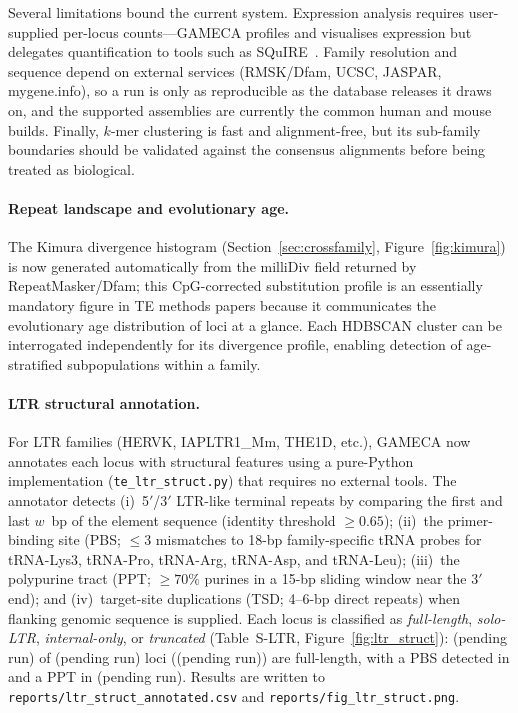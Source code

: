 \documentclass[11pt]{article}
\providecommand{\ltrNloci}{(pending run)}\providecommand{\ltrNfull}{(pending run)}
\providecommand{\ltrNppt}{(pending run)}\providecommand{\ltrPctFull}{(pending run)}
\begin{document}
Several limitations bound the current system. Expression analysis requires user-supplied
per-locus counts---GAMECA profiles and visualises expression but delegates quantification to
tools such as SQuIRE~\citep{yang2019squire}. Family resolution and sequence depend on
external services (RMSK/Dfam, UCSC, JASPAR, mygene.info), so a run is only as reproducible as
the database releases it draws on, and the supported assemblies are currently the common
human and mouse builds. Finally, $k$-mer clustering is fast and alignment-free, but its
sub-family boundaries should be validated against the consensus alignments before being
treated as biological.

\paragraph{Repeat landscape and evolutionary age.}
The Kimura divergence histogram (Section~\ref{sec:crossfamily}, Figure~\ref{fig:kimura})
is now generated automatically from the milliDiv field returned by RepeatMasker/Dfam; this
CpG-corrected substitution profile is an essentially mandatory figure in TE methods papers
because it communicates the evolutionary age distribution of loci at a glance.  Each
HDBSCAN cluster can be interrogated independently for its divergence profile, enabling
detection of age-stratified subpopulations within a family.

\paragraph{LTR structural annotation.}
For LTR families (HERVK, IAPLTR1\_Mm, THE1D, etc.), GAMECA now annotates each locus
with structural features using a pure-Python implementation (\texttt{te\_ltr\_struct.py})
that requires no external tools.  The annotator detects (i)~5$'$/3$'$ LTR-like terminal
repeats by comparing the first and last $w$~bp of the element sequence (identity
threshold $\geq 0.65$); (ii)~the primer-binding site (PBS; $\leq 3$ mismatches to
18-bp family-specific tRNA probes for tRNA-Lys3, tRNA-Pro, tRNA-Arg, tRNA-Asp, and
tRNA-Leu); (iii)~the polypurine tract (PPT; $\geq 70\%$ purines in a 15-bp sliding
window near the 3$'$ end); and (iv)~target-site duplications (TSD; 4--6-bp direct
repeats) when flanking genomic sequence is supplied.  Each locus is classified as
\emph{full-length}, \emph{solo-LTR}, \emph{internal-only}, or \emph{truncated}
(Table~S-LTR, Figure~\ref{fig:ltr_struct}): \ltrNfull{} of \ltrNloci{} loci
(\ltrPctFull) are full-length, with a PBS detected in \ltrNpbs{} and a PPT in
\ltrNppt.  Results are written to \texttt{reports/ltr\_struct\_annotated.csv}
and \texttt{reports/fig\_ltr\_struct.png}.
\end{document}

